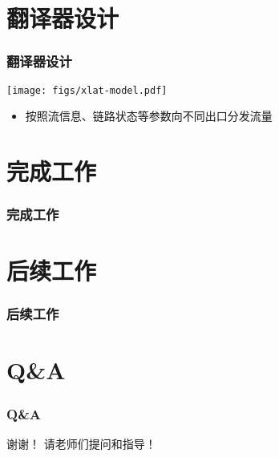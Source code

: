 \documentclass{beamer}
\begin{document}
\section{翻译器设计}
\begin{frame}
  \frametitle{翻译器设计}

  \begin{center}
    \texttt{[image: figs/xlat-model.pdf]}  
  \end{center}

  \begin{block}{}
    \begin{itemize}
    \item 按照流信息、链路状态等参数向不同出口分发流量
    \end{itemize}
  \end{block}
\end{frame}

\section{完成工作}
\begin{frame}
  \frametitle{完成工作}

\end{frame}

\section{后续工作}
\begin{frame}
  \frametitle{后续工作}

\end{frame}

\section{Q\&A}

\begin{frame}
  \frametitle{Q\&A}
  \begin{center}
  {\LARGE 谢谢！}
  \vspace{3em}
  {\LARGE 请老师们提问和指导！}
  \end{center}
\end{frame}
\end{document}
